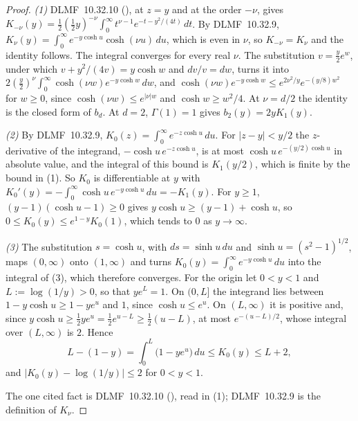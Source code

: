 \begin{proof}
\leanok
\emph{(1)} DLMF~10.32.10 (), at $z = y$ and at the order $-\nu$, gives
$K_{-\nu}(y) = \tfrac12(\tfrac12y)^{-\nu}\int_0^\infty t^{\nu-1}e^{-t - y^2/(4t)}\,dt$. By
DLMF~10.32.9, $K_\nu(y) = \int_0^\infty e^{-y\cosh u}\cosh(\nu u)\,du$, which is even in $\nu$, so
$K_{-\nu} = K_\nu$ and the identity follows. The integral converges for every real $\nu$. The
substitution $v = \tfrac y2e^w$, under which $v + y^2/(4v) = y\cosh w$ and $dv/v = dw$, turns it into
$2(\tfrac y2)^\nu\int_0^\infty\cosh(\nu w)e^{-y\cosh w}\,dw$, and
$\cosh(\nu w)e^{-y\cosh w} \le e^{2\nu^2/y}e^{-(y/8)w^2}$ for $w \ge 0$, since
$\cosh(\nu w) \le e^{|\nu|w}$ and $\cosh w \ge w^2/4$. At $\nu = d/2$ the identity is the closed form
of $b_d$. At $d = 2$, $\Gamma(1) = 1$ gives $b_2(y) = 2yK_1(y)$.

\emph{(2)} By DLMF~10.32.9, $K_0(z) = \int_0^\infty e^{-z\cosh u}\,du$. For $|z - y| < y/2$ the
$z$-derivative of the integrand, $-\cosh u\,e^{-z\cosh u}$, is at most
$\cosh u\,e^{-(y/2)\cosh u}$ in absolute value, and the integral of this bound is $K_1(y/2)$, which is
finite by the bound in (1). So $K_0$ is differentiable at $y$ with
$K_0'(y) = -\int_0^\infty\cosh u\,e^{-y\cosh u}\,du = -K_1(y)$. For $y \ge 1$,
$(y - 1)(\cosh u - 1) \ge 0$ gives $y\cosh u \ge (y - 1) + \cosh u$, so
$0 \le K_0(y) \le e^{1-y}K_0(1)$, which tends to $0$ as $y \to \infty$.

\emph{(3)} The substitution $s = \cosh u$, with $ds = \sinh u\,du$ and
$\sinh u = (s^2 - 1)^{1/2}$, maps $(0,\infty)$ onto $(1,\infty)$ and turns
$K_0(y) = \int_0^\infty e^{-y\cosh u}\,du$ into the integral of (3), which therefore converges. For the
origin let $0 < y < 1$ and $L := \log(1/y) > 0$, so that $ye^L = 1$. On $(0, L]$ the integrand lies
between $1 - y\cosh u \ge 1 - ye^u$ and $1$, since $\cosh u \le e^u$. On $(L, \infty)$ it is positive
and, since $y\cosh u \ge \tfrac12ye^u = \tfrac12e^{u-L} \ge \tfrac12(u - L)$, at most
$e^{-(u-L)/2}$, whose integral over $(L,\infty)$ is $2$. Hence
\[
  L - (1 - y) = \int_0^L\bigl(1 - ye^u\bigr)\,du \le K_0(y) \le L + 2 ,
\]
and $|K_0(y) - \log(1/y)| \le 2$ for $0 < y < 1$.

The one cited fact is DLMF~10.32.10 (), read in (1); DLMF~10.32.9 is the definition of
$K_\nu$.
\end{proof}

